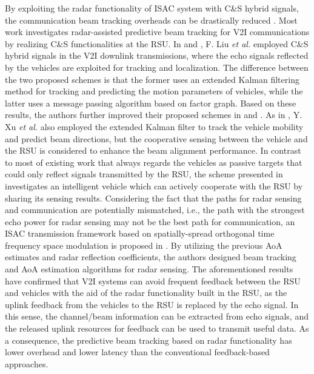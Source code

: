 \documentclass[journal,comsoc]{IEEEtran}
\begin{document}
By exploiting the radar functionality of ISAC system with C\&S hybrid signals, the communication beam tracking overheads can be drastically reduced \cite{Radar-Assisted-Predictive-Beamforming-2020,Bayesian-Predictive-Beamforming-2021,Predictive-Beam-Tracking-Cooperative-Sensing-2021,A-Novel-ISAC-2022,ISAC-V2I-beamforming-2022,Vehicular-Connectivity-Complex-Trajectories-2022}.  Most work investigates radar-assisted predictive beam tracking for V2I communications by realizing C\&S  functionalities at the RSU. In \cite{Radar-Assisted-Predictive-Beamforming-2020} and \cite{Bayesian-Predictive-Beamforming-2021}, F. Liu \emph{et al.} employed C\&S hybrid signals in the V2I downlink transmissions, where the echo signals reflected by the vehicles are exploited for tracking and localization. The difference between the two proposed schemes is that the former uses an extended Kalman
filtering method for tracking and predicting the motion parameters of vehicles, while the latter uses a message passing algorithm based on factor graph. Based on these results, the authors further improved their proposed schemes in \cite{ISAC-V2I-beamforming-2022} and \cite{Vehicular-Connectivity-Complex-Trajectories-2022}. As in \cite{Radar-Assisted-Predictive-Beamforming-2020}, Y. Xu \emph{et al.} \cite{Predictive-Beam-Tracking-Cooperative-Sensing-2021} also employed the extended Kalman filter to track the vehicle mobility and predict beam directions, but the cooperative sensing between the vehicle and the RSU is considered to enhance the beam alignment performance. In contrast to most of existing work that always regards the vehicles as passive targets that could only reflect signals transmitted by the RSU, the scheme presented in \cite{Predictive-Beam-Tracking-Cooperative-Sensing-2021} investigates an intelligent vehicle which can actively cooperate with the RSU by sharing its sensing results. Considering the fact that the paths for radar sensing and communication are potentially mismatched, i.e., the path with the strongest echo power for radar sensing may not be the best path for communication, an ISAC transmission framework based on spatially-spread orthogonal time frequency space modulation is proposed in \cite{A-Novel-ISAC-2022}. By utilizing the previous AoA estimates and radar reflection coefficients, the authors designed beam tracking and AoA estimation algorithms for radar sensing. The aforementioned results have confirmed that V2I systems can avoid frequent feedback between the RSU and vehicles with the aid of the radar functionality built in the RSU, as the uplink feedback from the vehicles to the RSU is replaced by the echo signal. In this sense, the channel/beam information can be extracted from echo signals, and the released uplink resources for feedback can be used to transmit useful data. As a consequence, the predictive beam tracking based on radar functionality has lower overhead and lower latency than the conventional feedback-based approaches.
\end{document}
